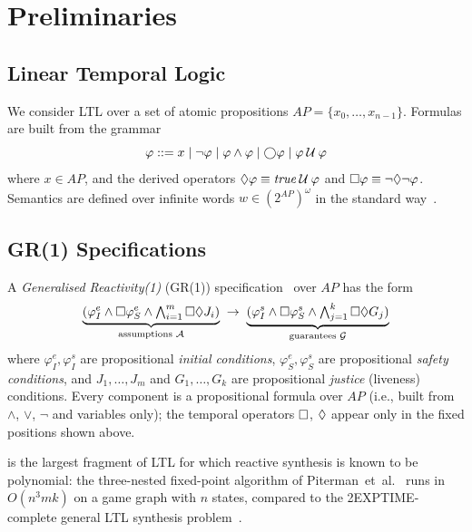\section{Preliminaries}\label{sec:prelims}

\subsection{Linear Temporal Logic}

We consider LTL over a set of atomic propositions $\mathit{AP} = \{x_0, \ldots, x_{n-1}\}$.
Formulas are built from the grammar
\[
  \varphi ::= x \mid \lnot\varphi \mid \varphi \land \varphi \mid
  \bigcirc\varphi \mid \varphi \mathbin{\mathcal{U}} \varphi
\]
where $x \in \mathit{AP}$, and the derived operators
$\Diamond\varphi \equiv \mathit{true} \mathbin{\mathcal{U}} \varphi$ and
$\square\varphi \equiv \lnot\Diamond\lnot\varphi$.
Semantics are defined over infinite words $w \in (2^{\mathit{AP}})^\omega$ in the standard way~\cite{Pnueli77}.

\subsection{GR(1) Specifications}\label{sec:gr1}

A \emph{Generalised Reactivity(1)} (GR(1)) specification~\cite{PitermanPS06} over $\mathit{AP}$ has the form
\begin{equation}\label{eq:gr1}
  \underbrace{(\varphi_I^e \land \square \varphi_S^e \land
  \textstyle\bigwedge_{i=1}^{m} \square\Diamond J_i)}_{\text{assumptions } \mathcal{A}}
  \;\rightarrow\;
  \underbrace{(\varphi_I^s \land \square \varphi_S^s \land
  \textstyle\bigwedge_{j=1}^{k} \square\Diamond G_j)}_{\text{guarantees } \mathcal{G}}
\end{equation}
where $\varphi_I^e, \varphi_I^s$ are propositional \emph{initial conditions},
$\varphi_S^e, \varphi_S^s$ are propositional \emph{safety conditions},
and $J_1, \ldots, J_m$ and $G_1, \ldots, G_k$ are propositional
\emph{justice} (liveness) conditions.
Every component is a propositional formula over $\mathit{AP}$ (i.e., built from $\land$, $\lor$, $\lnot$ and variables only); the temporal operators $\square$, $\Diamond$ appear only in the fixed positions shown above.

\GRone is the largest fragment of LTL for which reactive synthesis
is known to be polynomial: the three-nested fixed-point algorithm of Piterman~et~al.~\cite{PitermanPS06} runs in $O(n^3 m k)$ on a game graph with $n$ states, compared to the 2EXPTIME-complete general LTL synthesis problem~\cite{PnueliR89}.

